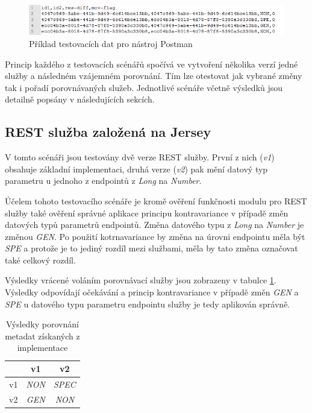 \documentclass[czech,DP]{thesiskiv}
\begin{document}
\begin{figure}[h]
	\centering
	\includegraphics[width=\linewidth]{test-data-csv.png}
	\caption{Příklad testovacích dat pro nástroj Postman}
	\label{fig:test-data-csv}
\end{figure}

Princip každého z testovacích scénářů spočívá ve vytvoření několika verzí jedné služby a následném vzájemném porovnání. Tím lze otestovat jak vybrané změny tak i pořadí porovnávaných služeb. Jednotlivé scénáře včetně výsledků jsou detailně popsány v následujících sekcích.

\subsection{REST služba založená na Jersey}

V tomto scénáři jsou testovány dvě verze REST služby. První z nich (\textit{v1}) obsahuje základní implementaci, druhá verze (\textit{v2}) pak mění datový typ parametru u jednoho z endpointů z \textit{Long} na \textit{Number}.

Účelem tohoto testovacího scénáře je kromě ověření funkčnosti modulu pro REST služby také ověření správné aplikace principu kontravariance v případě změn datových typů parametrů endpointů. Změna datového typu z \textit{Long} na \textit{Number} je změnou \textit{GEN}. Po použití kotrnavariance by změna na úrovni endpointu měla být \textit{SPE} a protože je to jediný rozdíl mezi službami, měla by tato změna označovat také celkový rozdíl.

Výsledky vrácené voláním porovnávací služby jsou zobrazeny v tabulce \ref{tab:jersey-cmp-res}. Výsledky odpovídají očekávání a princip kontravariance v případě změn \textit{GEN} a \textit{SPE} u datového typu parametru endpointu služby je tedy aplikován správně.

\begin{table}[h]
	\centering
	\begin{tabular}{|l||c|c|}
		\hline
		& v1 & v2 \\
		\hline
		\hline
		v1 & \textit{NON} & \textit{SPEC} \\
		\hline
		v2 & \textit{GEN} & \textit{NON} \\
		\hline
	\end{tabular}
	\caption{Výsledky porovnání metadat získaných z implementace}
	\label{tab:jersey-cmp-res}
\end{table}
	
\end{document}
